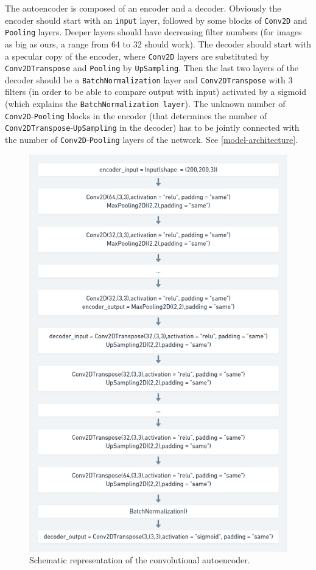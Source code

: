 \documentclass[aps,twocolumn,secnumarabic,nobalancelastpage,amsmath,amssymb,
nofootinbib]{revtex4}
\begin{document}
The autoencoder is composed of an encoder and a decoder. Obviously the
encoder should start with an \texttt{input} layer, followed by some
blocks of \texttt{Conv2D} and \texttt{Pooling} layers. Deeper layers
should have decreasing filter numbers (for images as big as ours, a
range from 64 to 32 should work). The decoder should start with a
specular copy of the encoder, where \texttt{Conv2D} layers are
substituted by \texttt{Conv2DTranspose} and \texttt{Pooling} by
\texttt{UpSampling}. Then the last two layers of the decoder should be a
\texttt{BatchNormalization} layer and \texttt{Conv2DTranspose} with 3
filters (in order to be able to compare output with input) activated by
a sigmoid (which explains the \texttt{BatchNormalization\ layer}). The
unknown number of \texttt{Conv2D}-\texttt{Pooling} blocks in the encoder
(that determines the number of
\texttt{Conv2DTranspose}-\texttt{UpSampling} in the decoder) has to be
jointly connected with the number of \texttt{Conv2D}-\texttt{Pooling}
layers of the network. See \ref{model-architecture}.

\begin{figure}
	\centering
	\includegraphics[width=0.7\linewidth]{Images/AEShort}
	\caption{Schematic representation of the convolutional autoencoder.}\label{fig:ae}
\end{figure}
\end{document}
